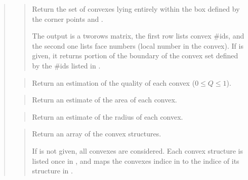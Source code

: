 \documentclass[a4paper,11pt,english]{sphinxmanual}
\begin{document}
\begin{quote}
\sphinxAtStartPar
{}
\begin{quote}

\sphinxAtStartPar
Return the set of convexes lying entirely within the box defined by the corner points  and .

\sphinxAtStartPar
The output  is a two\sphinxhyphen{}rows matrix, the first row lists convex
\#ids, and the second one lists face numbers (local number in the
convex). If  is given, it returns portion of the boundary of
the convex set defined by the \#ids listed in .
\end{quote}

\sphinxAtStartPar
{}
\begin{quote}

\sphinxAtStartPar
Return an estimation of the quality of each convex (\(0 \leq Q \leq 1\)).
\end{quote}

\sphinxAtStartPar
{}
\begin{quote}

\sphinxAtStartPar
Return an estimate of the area of each convex.
\end{quote}

\sphinxAtStartPar
{}
\begin{quote}

\sphinxAtStartPar
Return an estimate of the radius of each convex.
\end{quote}

\sphinxAtStartPar
{}
\begin{quote}

\sphinxAtStartPar
Return an array of the convex structures.

\sphinxAtStartPar
If  is not given, all convexes are considered. Each convex
structure is listed once in , and  maps the convexes
indice in  to the indice of its structure in .
\end{quote}


\end{quote}
\end{document}
